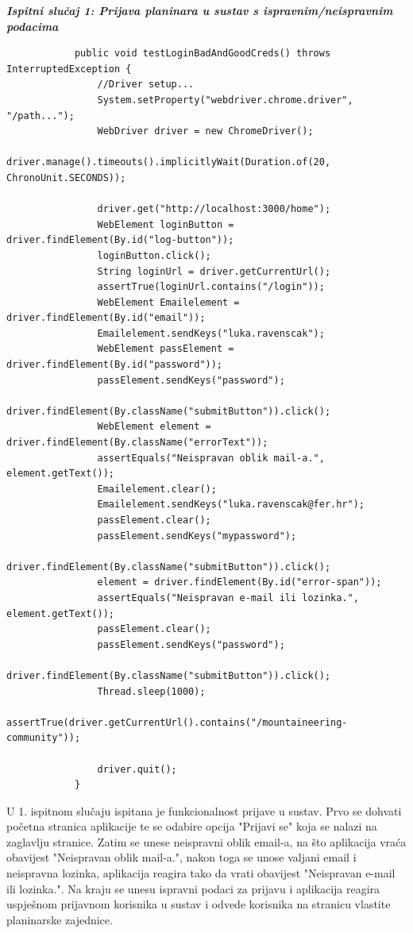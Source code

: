 		 	\textbf{\textit{Ispitni slučaj 1: Prijava planinara u sustav s ispravnim/neispravnim podacima}}
		 	
		 	\begin{lstlisting}
		 	public void testLoginBadAndGoodCreds() throws InterruptedException {
		 		//Driver setup...
		 		System.setProperty("webdriver.chrome.driver", "/path...");
		 		WebDriver driver = new ChromeDriver(); 
		 		driver.manage().timeouts().implicitlyWait(Duration.of(20, ChronoUnit.SECONDS));
		 		
		 		driver.get("http://localhost:3000/home");
		 		WebElement loginButton = driver.findElement(By.id("log-button"));
		 		loginButton.click();
		 		String loginUrl = driver.getCurrentUrl();
		 		assertTrue(loginUrl.contains("/login"));
		 		WebElement Emailelement = driver.findElement(By.id("email"));        
		 		Emailelement.sendKeys("luka.ravenscak");   
		 		WebElement passElement = driver.findElement(By.id("password"));
		 		passElement.sendKeys("password");
		 		driver.findElement(By.className("submitButton")).click();
		 		WebElement element = driver.findElement(By.className("errorText"));
		 		assertEquals("Neispravan oblik mail-a.", element.getText());
		 		Emailelement.clear();
		 		Emailelement.sendKeys("luka.ravenscak@fer.hr");
		 		passElement.clear();
		 		passElement.sendKeys("mypassword");
		 		driver.findElement(By.className("submitButton")).click();
		 		element = driver.findElement(By.id("error-span"));
		 		assertEquals("Neispravan e-mail ili lozinka.", element.getText());
		 		passElement.clear();
		 		passElement.sendKeys("password");
		 		driver.findElement(By.className("submitButton")).click();
		 		Thread.sleep(1000);
		 		assertTrue(driver.getCurrentUrl().contains("/mountaineering-community"));
		 		
		 		driver.quit();
		 	}
		 	\end{lstlisting}
	 	
	 	 U 1. ispitnom slučaju ispitana je funkcionalnost prijave u sustav. Prvo se dohvati početna stranica aplikacije te se odabire opcija "Prijavi se" koja se nalazi na zaglavlju stranice. Zatim se unese neispravni oblik email-a, na što aplikacija vraća obavijest "Neispravan oblik mail-a.", nakon toga se unose valjani email i neispravna lozinka, aplikacija reagira tako da vrati obavijest "Neispravan e-mail ili lozinka.". Na kraju se unesu ispravni podaci za prijavu i aplikacija reagira uspješnom prijavnom korisnika u sustav i odvede korisnika na stranicu vlastite planinarske zajednice.\newline
	 	 
